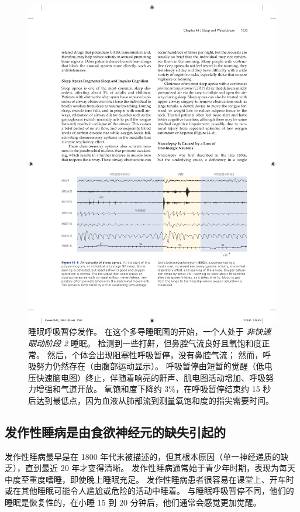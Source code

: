 \begin{figure}[htbp]
	\centering
	\includegraphics[width=1.0\linewidth]{chap44/fig_44_8}
	\caption{睡眠呼吸暂停发作。
		在这个多导睡眠图的开始，一个人处于 \textit{非快速眼动阶段 2} 睡眠。
		检测到一些打鼾，但鼻腔气流良好且氧饱和度正常。
		然后，个体会出现阻塞性呼吸暂停，没有鼻腔气流；
		然而，呼吸努力仍然存在（由腹部运动显示）。
		呼吸暂停由短暂的觉醒（低电压快速脑电图）终止，伴随着响亮的鼾声、肌电图活动增加、呼吸努力增强和气道开放。
		氧饱和度下降约 3\%，在呼吸暂停结束约 15 秒后达到最低点，因为血液从肺部流到测量氧饱和度的指尖需要时间。}
	\label{fig:44_8}
\end{figure}


\subsection{发作性睡病是由食欲神经元的缺失引起的}

发作性睡病最早是在 1800 年代末被描述的，但其根本原因（单一神经递质的缺乏），直到最近 20 年才变得清晰。
发作性睡病通常始于青少年时期，表现为每天中度至重度嗜睡，即使晚上睡眠充足。
发作性睡病患者很容易在课堂上、开车时或在其他睡眠可能令人尴尬或危险的活动中睡着。
与睡眠呼吸暂停不同，他们的睡眠是恢复性的，在小睡 15 到 20 分钟后，他们通常会感觉更加觉醒。


